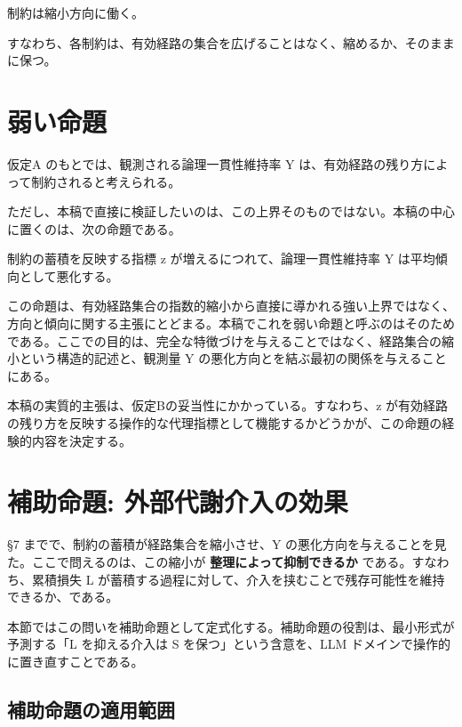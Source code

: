 \documentclass[12pt,a4paper]{article}
\begin{document}
\begin{assumption}[仮定C]
制約は縮小方向に働く。

すなわち、各制約は、有効経路の集合を広げることはなく、縮めるか、そのままに保つ。
\end{assumption}

\section{弱い命題}\label{ux5f31ux3044ux547dux984c}

仮定A のもとでは、観測される論理一貫性維持率 Y は、有効経路の残り方によって制約されると考えられる。

ただし、本稿で直接に検証したいのは、この上界そのものではない。本稿の中心に置くのは、次の命題である。

\begin{proposition}[主たる命題]
制約の蓄積を反映する指標 z が増えるにつれて、論理一貫性維持率 Y は平均傾向として悪化する。
\end{proposition}

この命題は、有効経路集合の指数的縮小から直接に導かれる強い上界ではなく、方向と傾向に関する主張にとどまる。本稿でこれを弱い命題と呼ぶのはそのためである。ここでの目的は、完全な特徴づけを与えることではなく、経路集合の縮小という構造的記述と、観測量 Y の悪化方向とを結ぶ最初の関係を与えることにある。

本稿の実質的主張は、仮定Bの妥当性にかかっている。すなわち、z が有効経路の残り方を反映する操作的な代理指標として機能するかどうかが、この命題の経験的内容を決定する。

\section{補助命題: 外部代謝介入の効果}\label{ux88dcux52a9ux547dux984c-ux5916ux90e8ux4ee3ux8b1dux4ecbux5165ux306eux52b9ux679c}

§7 までで、制約の蓄積が経路集合を縮小させ、Y の悪化方向を与えることを見た。ここで問えるのは、この縮小が \textbf{整理によって抑制できるか} である。すなわち、累積損失 L が蓄積する過程に対して、介入を挟むことで残存可能性を維持できるか、である。

本節ではこの問いを補助命題として定式化する。補助命題の役割は、最小形式が予測する「L を抑える介入は S を保つ」という含意を、LLM ドメインで操作的に置き直すことである。

\subsection{補助命題の適用範囲}\label{ux88dcux52a9ux547dux984cux306eux9069ux7528ux7bc4ux56f2}
\end{document}
